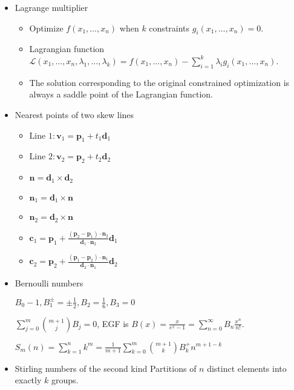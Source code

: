 \begin{itemize}
\item Lagrange multiplier

\begin{itemize}
  \item Optimize $f(x_1, \ldots, x_n)$ when $k$ constraints $g_i(x_1, \ldots, x_n)=0$.
  \item Lagrangian function \\$\mathcal{L}(x_1, \ldots, x_n, \lambda_1, \ldots, \lambda_k) = f(x_1, \ldots, x_n) - \sum^{k}_{i=1}\lambda_i g_i(x_1, \ldots, x_n)$.
  \item The solution corresponding to the original constrained optimization is always a saddle point of the Lagrangian function.
\end{itemize}

\item Nearest points of two skew lines

\begin{itemize}
\item $\text{Line 1}: \boldsymbol{v}_1 = \boldsymbol{p}_1 + t_1\boldsymbol{d}_1$
\item $\text{Line 2}: \boldsymbol{v}_2 = \boldsymbol{p}_2 + t_2\boldsymbol{d}_2$
\item $\boldsymbol{n} = \boldsymbol{d}_1\times \boldsymbol{d}_2$
\item $\boldsymbol{n}_1 = \boldsymbol{d}_1 \times \boldsymbol{n}$
\item $\boldsymbol{n}_2 = \boldsymbol{d}_2 \times \boldsymbol{n}$
\item $\boldsymbol{c}_1 = \boldsymbol{p}_1 + \frac{(\boldsymbol{p}_2 - \boldsymbol{p}_1)\cdot\boldsymbol{n}_2}{\boldsymbol{d}_1\cdot\boldsymbol{n}_2}\boldsymbol{d}_1$
\item $\boldsymbol{c}_2 = \boldsymbol{p}_2 + \frac{(\boldsymbol{p}_1 - \boldsymbol{p}_2)\cdot\boldsymbol{n}_1}{\boldsymbol{d}_2\cdot\boldsymbol{n}_1}\boldsymbol{d}_2$
\end{itemize}

\item Bernoulli numbers

$B_0-1,B_1^{\pm}=\pm\frac{1}{2},B_2=\frac{1}{6},B_3=0$

$\displaystyle\sum_{j=0}^m\binom{m+1}{j}B_j=0$, EGF is $B(x) = \frac{x}{e^x - 1}=\displaystyle\sum_{n=0}^\infty B_n\frac{x^n}{n!}$.

$S_m(n)=\displaystyle\sum_{k=1}^nk^m=\frac{1}{m+1}\sum_{k=0}^m\binom{m+1}{k}B^{+}_kn^{m+1-k}$

\item Stirling numbers of the second kind
Partitions of $n$ distinct elements into exactly $k$ groups. 


\end{itemize}
